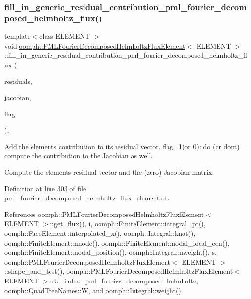 \subsubsection{\texorpdfstring{fill\+\_\+in\+\_\+generic\+\_\+residual\+\_\+contribution\+\_\+pml\+\_\+fourier\+\_\+decomposed\+\_\+helmholtz\+\_\+flux()}{fill\_in\_generic\_residual\_contribution\_pml\_fourier\_decomposed\_helmholtz\_flux()}}
{\footnotesize\ttfamily template$<$class E\+L\+E\+M\+E\+NT $>$ \\
void \hyperlink{classoomph_1_1PMLFourierDecomposedHelmholtzFluxElement}{oomph\+::\+P\+M\+L\+Fourier\+Decomposed\+Helmholtz\+Flux\+Element}$<$ E\+L\+E\+M\+E\+NT $>$\+::fill\+\_\+in\+\_\+generic\+\_\+residual\+\_\+contribution\+\_\+pml\+\_\+fourier\+\_\+decomposed\+\_\+helmholtz\+\_\+flux (\begin{DoxyParamCaption}\item[{\hyperlink{classoomph_1_1Vector}{Vector}$<$ double $>$ \&}]{residuals,  }\item[{\hyperlink{classoomph_1_1DenseMatrix}{Dense\+Matrix}$<$ double $>$ \&}]{jacobian,  }\item[{const unsigned \&}]{flag }\end{DoxyParamCaption})\hspace{0.3cm}{\ttfamily [protected]}, {\ttfamily [virtual]}}



Add the element\textquotesingle{}s contribution to its residual vector. flag=1(or 0)\+: do (or don\textquotesingle{}t) compute the contribution to the Jacobian as well. 

Compute the element\textquotesingle{}s residual vector and the (zero) Jacobian matrix. 

Definition at line 303 of file pml\+\_\+fourier\+\_\+decomposed\+\_\+helmholtz\+\_\+flux\+\_\+elements.\+h.



References oomph\+::\+P\+M\+L\+Fourier\+Decomposed\+Helmholtz\+Flux\+Element$<$ E\+L\+E\+M\+E\+N\+T $>$\+::get\+\_\+flux(), i, oomph\+::\+Finite\+Element\+::integral\+\_\+pt(), oomph\+::\+Face\+Element\+::interpolated\+\_\+x(), oomph\+::\+Integral\+::knot(), oomph\+::\+Finite\+Element\+::nnode(), oomph\+::\+Finite\+Element\+::nodal\+\_\+local\+\_\+eqn(), oomph\+::\+Finite\+Element\+::nodal\+\_\+position(), oomph\+::\+Integral\+::nweight(), s, oomph\+::\+P\+M\+L\+Fourier\+Decomposed\+Helmholtz\+Flux\+Element$<$ E\+L\+E\+M\+E\+N\+T $>$\+::shape\+\_\+and\+\_\+test(), oomph\+::\+P\+M\+L\+Fourier\+Decomposed\+Helmholtz\+Flux\+Element$<$ E\+L\+E\+M\+E\+N\+T $>$\+::\+U\+\_\+index\+\_\+pml\+\_\+fourier\+\_\+decomposed\+\_\+helmholtz, oomph\+::\+Quad\+Tree\+Names\+::W, and oomph\+::\+Integral\+::weight().



